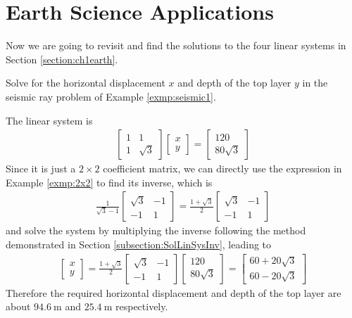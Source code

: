 \section{Earth Science Applications}
\label{section:ch3earth}
Now we are going to revisit and find the solutions to the four linear systems in Section \ref{section:ch1earth}.
\begin{exmp}
Solve for the horizontal displacement $x$ and depth of the top layer $y$ in the seismic ray problem of Example \ref{exmp:seismic1}.
\end{exmp}
\begin{solution}
The linear system is
\begin{align*}
\begin{bmatrix}
1 & 1 \\
1 & \sqrt{3}
\end{bmatrix}
\begin{bmatrix}
x \\
y
\end{bmatrix}
=
\begin{bmatrix}
120 \\
80\sqrt{3}
\end{bmatrix}
\end{align*}
Since it is just a $2 \times 2$ coefficient matrix, we can directly use the expression in Example \ref{exmp:2x2} to find its inverse, which is
\begin{align*}
\frac{1}{\sqrt{3}-1}
\begin{bmatrix}
\sqrt{3} & -1 \\
-1 & 1
\end{bmatrix}
=
\frac{1+\sqrt{3}}{2}
\begin{bmatrix}
\sqrt{3} & -1 \\
-1 & 1
\end{bmatrix}
\end{align*}
and solve the system by multiplying the inverse following the method demonstrated in Section \ref{subsection:SolLinSysInv}, leading to
\begin{align*}
\begin{bmatrix}
x \\
y
\end{bmatrix}
=
\frac{1+\sqrt{3}}{2}
\begin{bmatrix}
\sqrt{3} & -1 \\
-1 & 1
\end{bmatrix}
\begin{bmatrix}
120 \\
80\sqrt{3}
\end{bmatrix}
=
\begin{bmatrix}
60+20\sqrt{3}\\
60-20\sqrt{3}
\end{bmatrix}
\end{align*}
Therefore the required horizontal displacement and depth of the top layer are about $\SI{94.6}{\m}$ and $\SI{25.4}{\m}$ respectively.
\end{solution}

